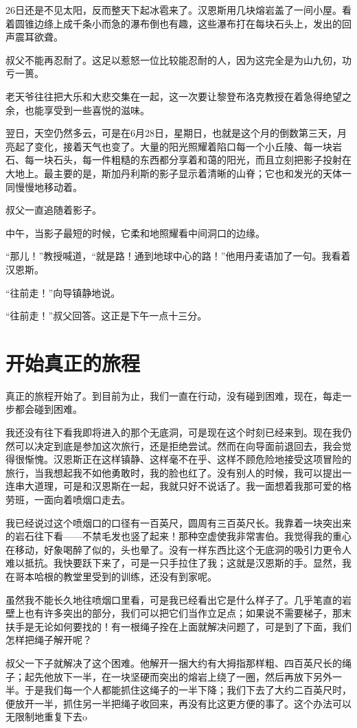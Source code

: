 \documentclass[10pt]{book}
\begin{document}
26日还是不见太阳，反而整天下起冰雹来了。汉恩斯用几块熔岩盖了一间小屋。看着圆锥边绦上成千条小而急的瀑布倒也有趣，这些瀑布打在每块石头上，发出的回声震耳欲聋。

叔父不能再忍耐了。这足以惹怒一位比较能忍耐的人，因为这完全是为山九仞，功亏一篑。

老天爷往往把大乐和大悲交集在一起，这一次要让黎登布洛克教授在着急得绝望之余，也能享受到一些喜悦的滋味。

翌日，天空仍然多云，可是在6月28日，星期日，也就是这个月的倒数第三天，月亮起了变化，接着天气也变了。大量的阳光照耀着陷口每一个小丘陵、每一块岩石、每一块石头，每一件粗糙的东西都分享着和蔼的阳光，而且立刻把影子投射在大地上。最主要的是，斯加丹利斯的影子显示着清晰的山脊；它也和发光的天体一同慢慢地移动着。

叔父一直追随着影子。

中午，当影子最短的时候，它柔和地照耀看中间洞口的边缘。

“那儿！”教授喊道，“就是路！通到地球中心的路！”他用丹麦语加了一句。我看着汉恩斯。

“往前走！”向导镇静地说。

“往前走！”叔父回答。这正是下午一点十三分。
\chapter{开始真正的旅程}
真正的旅程开始了。到目前为止，我们一直在行动，没有碰到困难，现在，每走一步都会碰到困难。

我还没有往下看我即将进入的那个无底洞，可是现在这个时刻已经来到。现在我仍然可以决定到底是参加这次旅行，还是拒绝尝试。然而在向导面前退回去，我会觉得很惭愧。汉恩斯正在这样镇静、这样毫不在乎、这样不顾危险地接受这项冒险的旅行，当我想起我不如他勇敢时，我的脸也红了。没有别人的时候，我可以提出一连串大道理，可是和汉恩斯在一起，我就只好不说话了。我一面想着我那可爱的格劳班，一面向着喷烟口走去。

我已经说过这个喷烟口的口径有一百英尺，圆周有三百英尺长。我靠着一块突出来的岩石往下看——不禁毛发也竖了起来！那种空虚使我非常害伯。我觉得我的重心在移动，好象喝醉了似的，头也晕了。没有一样东西比这个无底洞的吸引力更令人难以抵抗。我快要跃下来了，可是一只手拉住了我；这就是汉恩斯的手。显然，我在哥本哈根的教堂里受到的训练，还没有到家呢。

虽然我不能长久地往喷烟口里看，可是我已经看出它是什么样子了。几乎笔直的岩壁上也有许多突出的部分，我们可以把它们当作立足点；如果说不需要梯子，那末扶手是无论如何要找的！有一根绳子拴在上面就解决问题了，可是到了下面，我们怎样把绳子解开呢？

叔父一下子就解决了这个困难。他解开一捆大约有大拇指那样粗、四百英尺长的绳子；起先他放下一半，在一块坚硬而突出的熔岩上绕了一圈，然后再放下另外一半。于是我们每一个人都能抓住这绳子的一半下降；我们下去了大约二百英尺时，便放开一半，抓住另一半把绳子收回来，再没有比这更方便的事了。这个办法可以无限制地重复下去o
\end{document}
